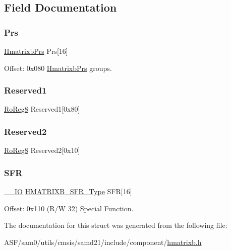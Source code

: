 \subsection{Field Documentation}
\mbox{\label{struct_hmatrixb_a06b252755e60d6f1f2e86069f65d0f2a}} 
\subsubsection{\texorpdfstring{Prs}{Prs}}
{\footnotesize\ttfamily \mbox{\hyperlink{struct_hmatrixb_prs}{Hmatrixb\+Prs}} Prs\mbox{[}16\mbox{]}}



Offset\+: 0x080 \mbox{\hyperlink{struct_hmatrixb_prs}{Hmatrixb\+Prs}} groups. 

\mbox{\label{struct_hmatrixb_adf07006bcb3e805c94d1338914b6af31}} 
\subsubsection{\texorpdfstring{Reserved1}{Reserved1}}
{\footnotesize\ttfamily \mbox{\hyperlink{group___s_a_m_d21_e15_a__definitions_ga0d957f1433aaf5d70e4dc2b68288442d}{Ro\+Reg8}} Reserved1\mbox{[}0x80\mbox{]}}

\mbox{\label{struct_hmatrixb_ae2158c26e054ed7ec969e94e21328201}} 
\subsubsection{\texorpdfstring{Reserved2}{Reserved2}}
{\footnotesize\ttfamily \mbox{\hyperlink{group___s_a_m_d21_e15_a__definitions_ga0d957f1433aaf5d70e4dc2b68288442d}{Ro\+Reg8}} Reserved2\mbox{[}0x10\mbox{]}}

\mbox{\label{struct_hmatrixb_abfa1c65cbc02f3c790a16cc9be798c90}} 
\subsubsection{\texorpdfstring{SFR}{SFR}}
{\footnotesize\ttfamily \mbox{\hyperlink{core__cm0plus_8h_aec43007d9998a0a0e01faede4133d6be}{\+\_\+\+\_\+\+IO}} \mbox{\hyperlink{union_h_m_a_t_r_i_x_b___s_f_r___type}{H\+M\+A\+T\+R\+I\+X\+B\+\_\+\+S\+F\+R\+\_\+\+Type}} S\+FR\mbox{[}16\mbox{]}}



Offset\+: 0x110 (R/W 32) Special Function. 



The documentation for this struct was generated from the following file\+:\begin{DoxyCompactItemize}
\item 
A\+S\+F/sam0/utils/cmsis/samd21/include/component/\mbox{\hyperlink{hmatrixb_8h}{hmatrixb.\+h}}\end{DoxyCompactItemize}
